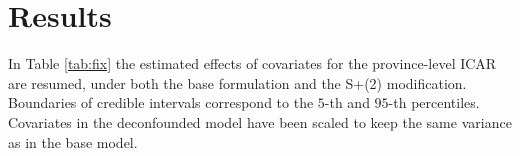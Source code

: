 \documentclass[openany]{book}
\begin{document}
\begin{table}[ht]
\caption{Model diagnostics for 8 ICAR model formulations: spatial aggregation level of $z$, spatial confounding treatment, negative Log Pseudo Marginal Likelihood, Watanabe-Akaike Information criterion, Deviance Information Criterion, Mean Squared Error of posterior predictive response averages.}
\label{tab:ICAR_diagnostics}
\end{table}
\section{Results}\label{Par:results} \label{section:results}

In Table \ref{tab:fix} the estimated effects of covariates for the province-level ICAR are resumed, under both the base formulation and the S+(2) modification. Boundaries of credible intervals correspond to the $5$-th and $95$-th percentiles. Covariates in the deconfounded model have been scaled to keep the same variance as in the base model.
\end{document}
